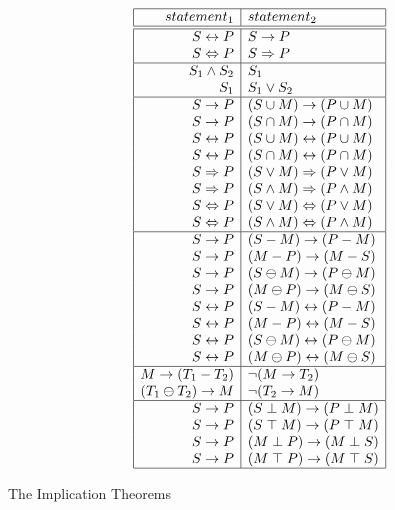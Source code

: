 \begin{description}
\begin{table}[htb]
\[\begin{array}{|r|l|} \hline
statement_1 & statement_2 \\
\hline \hline
S \leftrightarrow P & S \rightarrow P\\
S \Leftrightarrow P & S \Rightarrow P\\
\hline
S_1 \wedge S_2 & S_1 \\
S_1 & S_1 \vee S_2 \\
\hline
S \rightarrow P & (S \cup M) \rightarrow (P \cup M) \\
S \rightarrow P & (S \cap M) \rightarrow (P \cap M) \\
S \leftrightarrow P & (S \cup M) \leftrightarrow (P \cup M) \\
S \leftrightarrow P & (S \cap M) \leftrightarrow (P \cap M) \\
S \Rightarrow P & (S \vee M) \Rightarrow (P \vee M) \\
S \Rightarrow P & (S \wedge M) \Rightarrow (P \wedge M) \\
S \Leftrightarrow P & (S \vee M) \Leftrightarrow (P \vee M) \\
S \Leftrightarrow P & (S \wedge M) \Leftrightarrow (P \wedge M) \\
\hline
S \rightarrow P & (S - M) \rightarrow (P - M) \\
S \rightarrow P & (M - P) \rightarrow (M - S) \\
S \rightarrow P & (S \ominus M) \rightarrow (P \ominus M) \\
S \rightarrow P & (M \ominus P) \rightarrow (M \ominus S) \\
S \leftrightarrow P & (S - M) \leftrightarrow (P - M) \\
S \leftrightarrow P & (M - P) \leftrightarrow (M - S) \\
S \leftrightarrow P & (S \ominus M) \leftrightarrow (P \ominus M) \\
S \leftrightarrow P & (M \ominus P) \leftrightarrow (M \ominus S) \\
\hline
M \rightarrow (T_1 - T_2) & \neg(M \rightarrow T_2) \\
(T_1 \ominus T_2) \rightarrow M & \neg(T_2 \rightarrow M) \\
\hline
S \rightarrow P & (S \; \bot \; M) \rightarrow (P \; \bot \; M)   \\
S \rightarrow P & (S \; \top \; M) \rightarrow (P \; \top \; M)   \\
S \rightarrow P & (M \; \bot \; P) \rightarrow (M \; \bot \; S)   \\
S \rightarrow P & (M \; \top \; P) \rightarrow (M \; \top \; S)   \\
\hline \end{array}\]
\caption{The Implication Theorems}
\label{Implication-Theorems}
\end{table}


\end{description}
